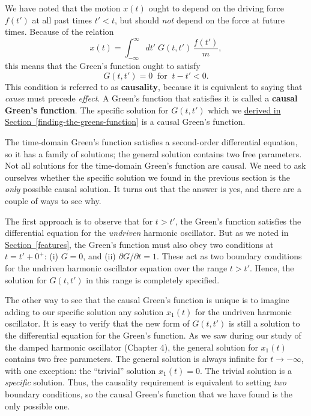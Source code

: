 \documentclass[10pt,a4paper]{article}
\begin{document}
We have noted that the motion $x(t)$ ought to depend on the driving
force $f(t')$ at all past times $t' < t$, but should \emph{not} depend
on the force at future times. Because of the relation
\begin{equation}
  x(t) = \int_{-\infty}^\infty dt'\; G(t,t')\, \frac{f(t')}{m},
\end{equation}
this means that the Green's function ought to satisfy
\begin{equation}
  G(t,t') = 0 \;\; \mathrm{for}\;\; t -t' < 0.
\end{equation}
This condition is referred to as \textbf{causality}, because it is
equivalent to saying that \emph{cause} must precede \emph{effect}. A
Green's function that satisfies it is called a \textbf{causal Green's
  function}. The specific solution for $G(t,t')$ which we
\hyperref[finding-the-greens-function]{derived in
  Section~\ref{finding-the-greens-function}} is a causal Green's
function.

The time-domain Green's function satisfies a second-order differential
equation, so it has a family of solutions; the general solution
contains two free parameters. Not all solutions for the time-domain
Green's function are causal. We need to ask ourselves whether the
specific solution we found in the previous section is the \emph{only}
possible causal solution. It turns out that the answer is yes, and
there are a couple of ways to see why.

The first approach is to observe that for $t > t'$, the Green's
function satisfies the differential equation for the \emph{undriven}
harmonic oscillator.  But as we noted in
\hyperref[features]{Section~\ref{features}}, the Green's function must
also obey two conditions at $t = t' + 0^+$: (i) $G = 0$, and (ii)
$\partial G / \partial t = 1$. These act as two boundary conditions
for the undriven harmonic oscillator equation over the range $t > t'$.
Hence, the solution for $G(t,t')$ in this range is completely
specified.

The other way to see that the causal Green's function is unique is to
imagine adding to our specific solution any solution $x_1(t)$ for the
undriven harmonic oscillator. It is easy to verify that the new form
of $G(t,t')$ is still a solution to the differential equation for the
Green's function. As we saw during our study of the damped harmonic
oscillator (Chapter 4), the general solution for $x_1(t)$ contains two
free parameters. The general solution is always infinite for $t
\rightarrow -\infty$, with one exception: the ``trivial'' solution
$x_1(t) = 0$. The trivial solution is a \emph{specific}
solution. Thus, the causality requirement is equivalent to setting
\emph{two} boundary conditions, so the causal Green's function that we
have found is the only possible one.
\end{document}
